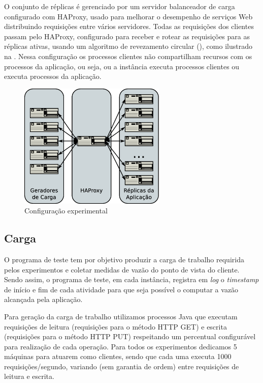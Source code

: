 O conjunto de réplicas é gerenciado por um servidor balanceador de carga configurado com
HAProxy, usado para melhorar o desempenho de serviços Web distribuindo requisições entre
vários servidores. Todas as requisições dos clientes passam pelo HAProxy, configurado para
receber e rotear as requisições para as réplicas ativas, usando um algoritmo de
revezamento circular (), como ilustrado na . Nessa
configuração os processos clientes não compartilham recursos com os processos da
aplicação, ou seja, ou a instância executa processos clientes ou executa processos da
aplicação.

\begin{figure}[ht]
  \centering
  \includegraphics[width=7cm]{conteudo/capitulos/figuras/experimental-setup.dia.eps}
  \caption{Configuração experimental}
  \label{fig:setup}
\end{figure}

\subsection{Carga}

O programa de teste tem por objetivo produzir a carga de trabalho requirida pelos
experimentos e coletar medidas de vazão do ponto de vista do cliente. Sendo assim, o
programa de teste, em cada instância, registra em \emph{log} o \emph{timestamp} de início
e fim de cada atividade para que seja possível o computar a vazão alcançada pela
aplicação.

Para geração da carga de trabalho utilizamos processos Java que executam requisições de
leitura (requisições para o método HTTP GET) e escrita (requisições para o método HTTP
PUT) respeitando um percentual configurável para realização de cada operação. Para todos
os experimentos dedicamos 5 máquinas para atuarem como clientes, sendo que cada uma
executa 1000 requisições/segundo, variando (sem garantia de ordem) entre requisições de
leitura e escrita.

